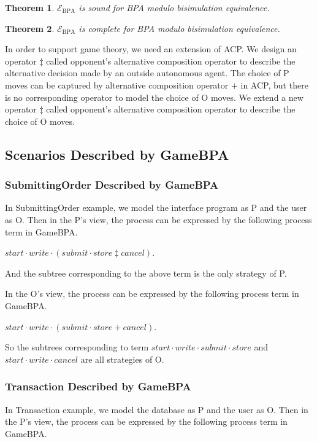 \documentclass{fac}
\newtheorem{theorem}{Theorem}[section]
\begin{document}
\begin{theorem}
$\mathcal{E}_{\textrm{BPA}}$  is sound for BPA modulo bisimulation equivalence.
\end{theorem}

\begin{theorem}
$\mathcal{E}_{\textrm{BPA}}$ is complete for BPA modulo bisimulation equivalence.
\end{theorem}

In order to support game theory, we need an extension of ACP. We design an operator $\ddagger$ called opponent's alternative composition operator to describe the alternative decision made by an outside autonomous agent. The choice of P moves can be captured by alternative composition operator $+$ in ACP, but there is no corresponding operator to model the choice of O moves. We extend a new operator $\ddagger$ called opponent's alternative composition operator to describe the choice of O moves.

\subsection{Scenarios Described by GameBPA}

\subsubsection{SubmittingOrder Described by GameBPA}

In SubmittingOrder example, we model the interface program as P and the user as O. Then in the P's view, the process can be expressed by the following process term in GameBPA.

$start\cdot write\cdot (submit\cdot store \ddagger cancel)$.

And the subtree corresponding to the above term is the only strategy of P.

In the O's view, the process can be expressed by the following process term in GameBPA.

$start\cdot write\cdot (submit\cdot store + cancel)$.

So the subtrees corresponding to term $start\cdot write\cdot submit\cdot store$ and $start\cdot write\cdot cancel$ are all strategies of O.

\subsubsection{Transaction Described by GameBPA}

In Transaction example, we model the database as P and the user as O. Then in the P's view, the process can be expressed by the following process term in GameBPA.
\end{document}
